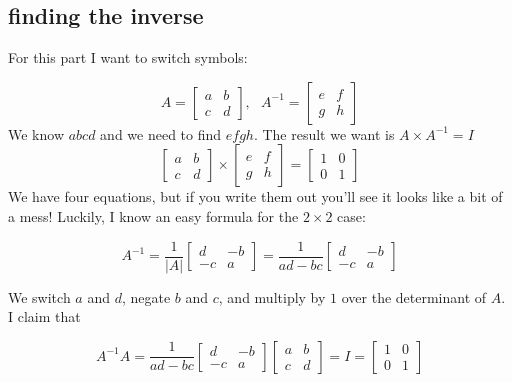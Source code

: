 \documentclass[11pt, oneside]{article}
\begin{document}
\subsection*{finding the inverse}

For this part I want to switch symbols:

\[
A =
\begin{bmatrix}
a & b \\
c & d
 \end{bmatrix},
 \ \ \
A^{-1}  =
\begin{bmatrix}
e & f \\
g & h
 \end{bmatrix}
\]
We know $abcd$ and we need to find $efgh$.
The result we want is $A \times A^{-1} = I$
\[
\begin{bmatrix}
a & b \\
c & d
 \end{bmatrix}
 \times
\begin{bmatrix}
e & f \\
g & h
 \end{bmatrix}
 =
\begin{bmatrix}
1 & 0 \\
0 & 1
 \end{bmatrix}
\]
We have four equations, but if you write them out you'll see it looks like a bit of a mess!  Luckily, I know an easy formula for the $2 \times 2$ case:

\[
A^{-1}  = \frac{1}{|A|} 
\begin{bmatrix}
d & -b \\
-c & a
 \end{bmatrix}
=
\frac{1}{ad-bc} 
\begin{bmatrix}
d & -b \\
-c & a
 \end{bmatrix}
\]

We switch $a$ and $d$, negate $b$ and $c$, and multiply by $1$ over the determinant of $A$.  I claim that

\[
A^{-1} A = 
\frac{1}{ad-bc} 
\begin{bmatrix}
d & -b \\
-c & a
 \end{bmatrix}
\begin{bmatrix}
a & b \\
c & d
 \end{bmatrix}
= I =
\begin{bmatrix}
1 & 0 \\
0 & 1
 \end{bmatrix}
\]
\end{document}
